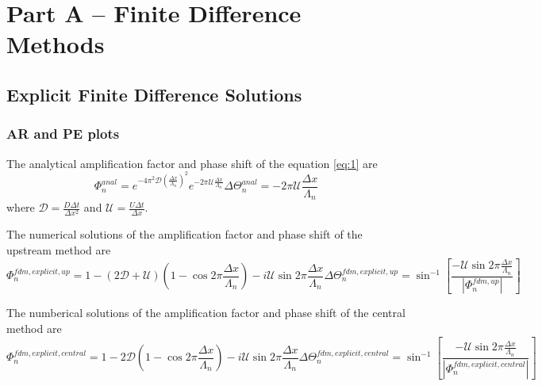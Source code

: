 \section{Part A -- Finite Difference Methods}
\subsection{Explicit Finite Difference Solutions}
\subsubsection{AR and PE plots} \label{fdm-explicit-ARPE}
The analytical amplification factor and phase shift of the equation \ref{eq:1} are
\begin{subequations}
  \begin{equation}
    \label{eq:3a}
    \Phi_n^{anal} = e^{-4\pi^2 \mathcal{D} (\frac{\Delta x}{\Lambda_n})^2} e^{-2\pi \mathcal{U} \frac{\Delta x}{\Lambda_n}}
  \end{equation}
  \begin{equation}
    \label{eq:3b}
    \Delta \Theta_n^{anal} = -2\pi \mathcal{U}\frac{\Delta x}{\Lambda_n}
  \end{equation}
\end{subequations}
where $\mathcal{D}=\frac{D\Delta t}{\Delta x^2}$ and $\mathcal{U}=\frac{U\Delta t}{\Delta x}$.

The numerical solutions of the amplification factor and phase shift of the upstream method are
\begin{subequations}
  \begin{equation}
    \label{eq:4a}
    \Phi_n^{fdm,explicit,up} = 1-(2\mathcal{D}+\mathcal{U})(1-\cos{2\pi \frac{\Delta x}{\Lambda_n}}) - i\mathcal{U}\sin{2\pi \frac{\Delta x}{\Lambda_n}}
  \end{equation}
  \begin{equation}
    \label{eq:4b}
    \Delta \Theta_n^{fdm,explicit,up} = \sin^{-1}[\frac{-\mathcal{U}\sin{2\pi\frac{\Delta x}{\Lambda_n}}}{|\Phi_n^{fdm,up}|}]
  \end{equation}
\end{subequations}

The numberical solutions of the amplification factor and phase shift of the central method are
\begin{subequations}
  \begin{equation}
    \label{eq:5a}
    \Phi_n^{fdm,explicit,central} = 1-2\mathcal{D}(1-\cos{2\pi \frac{\Delta x}{\Lambda_n}}) - i\mathcal{U}\sin{2\pi \frac{\Delta x}{\Lambda_n}}
  \end{equation}
  \begin{equation}
    \label{eq:5b}
    \Delta \Theta_n^{fdm,explicit,central} = \sin^{-1}[\frac{-\mathcal{U}\sin{2\pi\frac{\Delta x}{\Lambda_n}}}{|\Phi_n^{fdm,explicit,central}|}]
  \end{equation}
\end{subequations}


